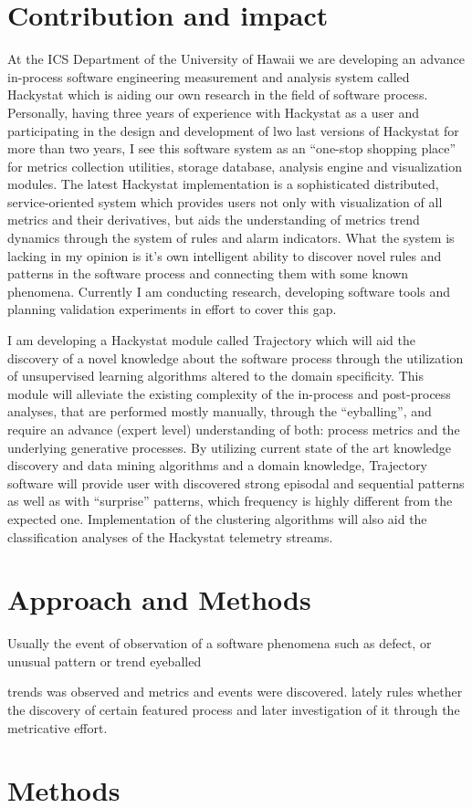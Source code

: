 \documentclass[11pt,oneside]{article}
\begin{document}
\section{Contribution and impact}
At the ICS Department of the University of Hawaii we are developing an advance in-process software engineering measurement and analysis system called Hackystat which is aiding our own research in the field of software process. Personally, having three years of experience with Hackystat as a user and participating in the design and development of lwo last versions of Hackystat for more than two years, I see this software system as an ``one-stop shopping place'' for metrics collection utilities, storage database, analysis engine and visualization modules. The latest Hackystat implementation is a sophisticated distributed, service-oriented system which provides users not only with visualization of all metrics and their derivatives, but aids the understanding of metrics trend dynamics through the system of rules and alarm indicators. What the system is lacking in my opinion is it's own intelligent ability to discover novel rules and patterns in the software process and connecting them with some known phenomena. Currently I am conducting research, developing software tools and planning validation experiments in effort to cover this gap.

I am developing a Hackystat module called Trajectory which will aid the discovery of a novel knowledge about the software process through the utilization of unsupervised learning algorithms altered to the domain specificity. This module will alleviate the existing complexity of the in-process and post-process analyses, that are performed mostly manually, through the ``eyballing'', and require an advance (expert level) understanding of both: process metrics and the underlying generative processes. By utilizing current state of the art knowledge discovery and data mining algorithms and a domain knowledge, Trajectory software will provide user with discovered strong episodal and sequential patterns as well as with ``surprise'' patterns, which frequency is highly different from the expected one. Implementation of the clustering algorithms will also aid the classification analyses of the Hackystat telemetry streams.

\section{Approach and Methods}



Usually the event of observation of a software phenomena such as defect, or unusual pattern or trend eyeballed 


trends was observed and metrics and events were discovered. lately rules whether the  discovery of certain featured process and later investigation of it through the metricative effort.


\section{Methods}
\end{document}
